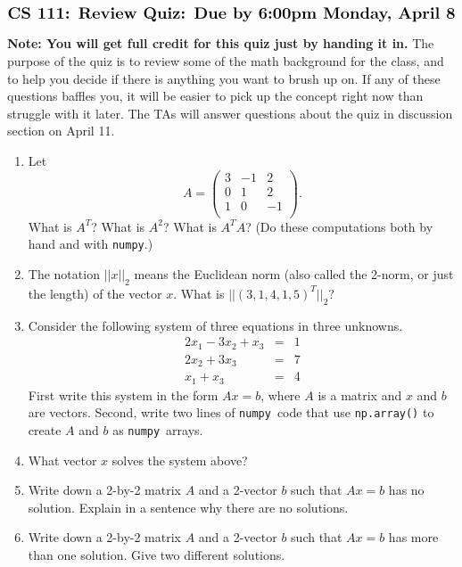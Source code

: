 \documentclass[11pt]{article}
\newcommand{\numpy}{{\tt numpy}}    %
\begin{document}
$$\mbox{\Large \bf CS 111: Review Quiz: Due by 6:00pm Monday, April 8}$$

\medskip

{\bf Note: You will get full credit for this quiz just by handing it in.}
The purpose of the quiz is to review some of the math background
for the class, and to help you decide if there is anything you want to 
brush up on.  If any of these questions baffles you,
it will be easier to pick up the concept right now than struggle with it
later.  The TAs will answer questions about the quiz in discussion 
section on April 11.



\begin{enumerate}

\item
Let
$$ A = \left(
\begin{array}{ccc}
3 & -1 & 2 \\ 	
0 & 1 & 2 \\ 
1 & 0 & -1 \\
\end{array} 
\right). $$
What is $A^T$?  What is $A^2$?  What is $A^TA$?
(Do these computations both by hand and with \numpy.)

\item
The notation $||x||_2$ means the Euclidean norm (also called the 2-norm,
or just the length) of the vector $x$.  
What is $||(3, 1, 4, 1, 5)^T||_2$?

\item
Consider the following system of three equations in three unknowns.
\begin{eqnarray}
 2x_1 - 3x_2 + x_3  & =  & 1 \\
 2x_2 + 3x_3  & =  & 7 \\
 x_1 + x_3  & = & 4 
\end{eqnarray}
First write this system in the form $Ax=b$, 
where $A$ is a matrix and $x$ and $b$ are vectors. 
Second, write two lines of \numpy\ code that use {\tt np.array()} to
create $A$ and $b$ as \numpy\ arrays.

\item
What vector $x$ solves the system above? 

\item
Write down a 2-by-2 matrix $A$ and a 2-vector $b$ such that $Ax=b$ has no 
solution.  Explain in a sentence why there are no solutions.

\item
Write down a 2-by-2 matrix $A$ and a 2-vector $b$ such that $Ax=b$ has 
more than one solution.  Give two different solutions.


\end{enumerate}
\end{document}

